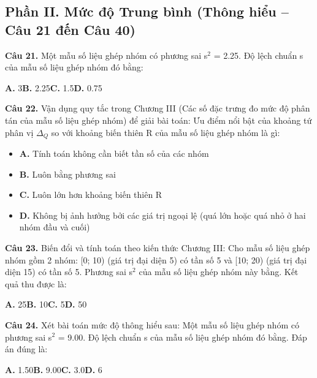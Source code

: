 \documentclass[11pt,a4paper]{article}
\begin{document}
\subsection*{\color{accent} Phần II. Mức độ Trung bình (Thông hiểu -- Câu 21 đến Câu 40)}
\textbf{\color{primary} Câu 21.} Một mẫu số liệu ghép nhóm có phương sai s$^2$ = 2.25. Độ lệch chuẩn s của mẫu số liệu ghép nhóm đó bằng:\par
\hspace*{1.5em}\textbf{A.} 3\quad\quad \textbf{B.} 2.25\quad\quad \textbf{C.} 1.5\quad\quad \textbf{D.} 0.75\par\vspace{2pt}
\textbf{\color{primary} Câu 22.} Vận dụng quy tắc trong Chương III (Các số đặc trưng đo mức độ phân tán của mẫu số liệu ghép nhóm) để giải bài toán: Ưu điểm nổi bật của khoảng tứ phân vị $\Delta_Q$ so với khoảng biến thiên R của mẫu số liệu ghép nhóm là gì:\par
\begin{itemize}\setlength{\itemsep}{1pt}\setlength{\parskip}{0pt}
  \item[] \textbf{A.} Tính toán không cần biết tần số của các nhóm
  \item[] \textbf{B.} Luôn bằng phương sai
  \item[] \textbf{C.} Luôn lớn hơn khoảng biến thiên R
  \item[] \textbf{D.} Không bị ảnh hưởng bởi các giá trị ngoại lệ (quá lớn hoặc quá nhỏ ở hai nhóm đầu và cuối)
\end{itemize}\vspace{2pt}
\textbf{\color{primary} Câu 23.} Biến đổi và tính toán theo kiến thức Chương III: Cho mẫu số liệu ghép nhóm gồm 2 nhóm: [0; 10) (giá trị đại diện 5) có tần số 5 và [10; 20) (giá trị đại diện 15) có tần số 5. Phương sai s$^2$ của mẫu số liệu ghép nhóm này bằng. Kết quả thu được là:\par
\hspace*{1.5em}\textbf{A.} 25\quad\quad \textbf{B.} 10\quad\quad \textbf{C.} 5\quad\quad \textbf{D.} 50\par\vspace{2pt}
\textbf{\color{primary} Câu 24.} Xét bài toán mức độ thông hiểu sau: Một mẫu số liệu ghép nhóm có phương sai s$^2$ = 9.00. Độ lệch chuẩn s của mẫu số liệu ghép nhóm đó bằng. Đáp án đúng là:\par
\hspace*{1.5em}\textbf{A.} 1.50\quad\quad \textbf{B.} 9.00\quad\quad \textbf{C.} 3.0\quad\quad \textbf{D.} 6\par\vspace{2pt}
\end{document}
